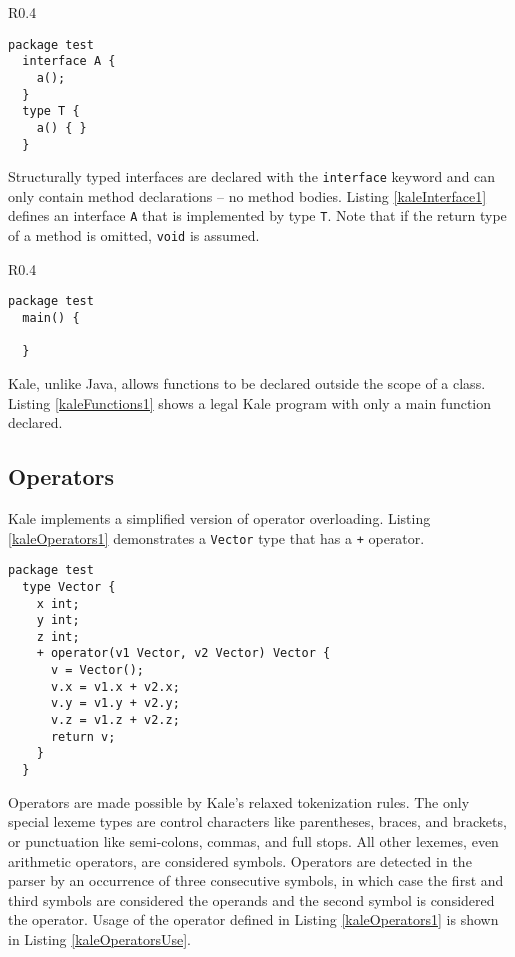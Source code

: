 \begin{wrapfigure}{R}{0.4\textwidth}
\begin{lstlisting}[language=Kale,caption=A Kale interface,label=kaleInterface1]
  package test
  interface A {
    a();
  }
  type T {
    a() { }
  }
\end{lstlisting}
\end{wrapfigure}

Structurally typed interfaces are declared with the \texttt{interface} keyword and can only contain method declarations  -- no method bodies.  Listing \ref{kaleInterface1} defines an interface \texttt{A} that is implemented by type \texttt{T}.  Note that if the return type of a method is omitted, \texttt{void} is assumed.

\begin{wrapfigure}{R}{0.4\textwidth}
\begin{lstlisting}[language=Kale,caption=A Kale main function,label=kaleFunctions1]
  package test
  main() {
    
  }
\end{lstlisting}
\end{wrapfigure}

Kale, unlike Java, allows functions to be declared outside the scope of a class.  Listing \ref{kaleFunctions1} shows a legal Kale program with only a main function declared.

\subsection{Operators}

Kale implements a simplified version of operator overloading.  Listing \ref{kaleOperators1} demonstrates a \texttt{Vector} type that has a \texttt{+} operator.

\begin{lstlisting}[language=Kale,caption=Operators in Kale,label=kaleOperators1]
  package test
  type Vector {
    x int;
    y int;
    z int;
    + operator(v1 Vector, v2 Vector) Vector {
      v = Vector();
      v.x = v1.x + v2.x;
      v.y = v1.y + v2.y;
      v.z = v1.z + v2.z;
      return v;
    }
  }
\end{lstlisting}

Operators are made possible by Kale's relaxed tokenization rules.  The only special lexeme types are control characters like parentheses, braces, and brackets, or punctuation like semi-colons, commas, and full stops.  All other lexemes, even arithmetic operators, are considered symbols.  Operators are detected in the parser by an occurrence of three consecutive symbols, in which case the first and third symbols are considered the operands and the second symbol is considered the operator.  Usage of the operator defined in Listing \ref{kaleOperators1} is shown in Listing \ref{kaleOperatorsUse}.

